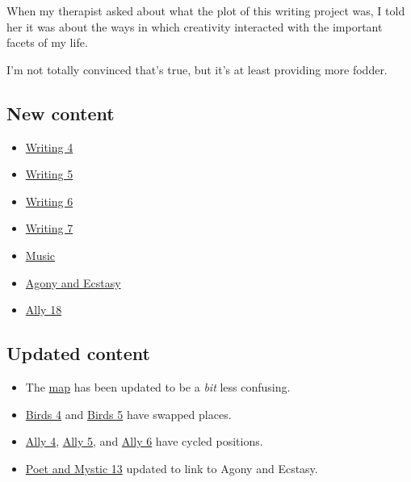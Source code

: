 When my therapist asked about what the plot of this writing project was, I told her it was about the ways in which creativity interacted with the important facets of my life.

I'm not totally convinced that's true, but it's at least providing more fodder.

\hypertarget{new-content}{%
\subsection{New content}\label{new-content}}

\begin{itemize}
\tightlist
\item
  \href{/writing/4}{Writing 4}
\item
  \href{/writing/5}{Writing 5}
\item
  \href{/writing/6}{Writing 6}
\item
  \href{/writing/7}{Writing 7}
\item
  \href{/writing/music}{Music}
\item
  \href{/poet-and-mystic/agony-and-ecstasy}{Agony and Ecstasy}
\item
  \href{/18}{Ally 18}
\end{itemize}

\hypertarget{updated-content}{%
\subsection{Updated content}\label{updated-content}}

\begin{itemize}
\tightlist
\item
  The \href{/map}{map} has been updated to be a \emph{bit} less confusing.
\item
  \href{/birds/4}{Birds 4} and \href{/birds/5}{Birds 5} have swapped places.
\item
  \href{/4}{Ally 4}, \href{/5}{Ally 5}, and \href{/6}{Ally 6} have cycled positions.
\item
  \href{/poet-and-mystic/13}{Poet and Mystic 13} updated to link to Agony and Ecstasy.
\end{itemize}
